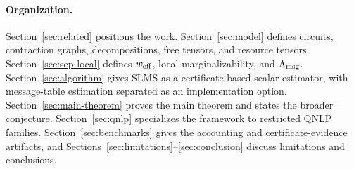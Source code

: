 \paragraph{Organization.}
Section~\ref{sec:related} positions the work. Section~\ref{sec:model} defines circuits, contraction graphs, decompositions, free tensors, and resource tensors. Section~\ref{sec:sep-local} defines \(w_{\mathrm{eff}}\), local marginalizability, and \(\Lambda_{\mathrm{msg}}\). Section~\ref{sec:algorithm} gives SLMS as a certificate-based scalar estimator, with message-table estimation separated as an implementation option. Section~\ref{sec:main-theorem} proves the main theorem and states the broader conjecture. Section~\ref{sec:qnlp} specializes the framework to restricted QNLP families. Section~\ref{sec:benchmarks} gives the accounting and certificate-evidence artifacts, and Sections~\ref{sec:limitations}--\ref{sec:conclusion} discuss limitations and conclusions.

